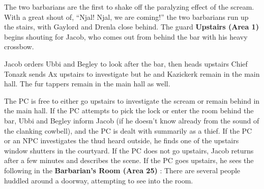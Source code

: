 \documentclass[a5paper,11pt,twoside]{book}
\newcommand{\MapText}[1]{
	{\color{DarkCyan} \textbf{#1}}
}
\newcommand{\QuoteText}[1]{
	{\color{Black!80} {\fontspec{Gotham-Book}\small#1}}
}
\begin{document}
{\QuoteText{The two barbarians are the first to shake off the paralyzing effect of the scream.
With a great shout of, “Njal! Njal, we are coming!” the two barbarians run up the stairs, with Gaylord and Drenla close behind.
The guard \MapText{Upstairs (Area 1)} begins shouting for Jacob, who comes out from behind the bar with his heavy crossbow.}

\QuoteText{Jacob orders Ubbi and Begley to look after the bar, then heads upstairs Chief Tonazk sends Ax upstairs to investigate but he and Kazickerk remain in the main hall.
The fur tappers remain in the main hall as well.}

The PC is free to either go upstairs to investigate the scream or remain behind in the main hall.
If the PC attempts to pick the lock or enter the room behind the bar, Ubbi and Begley inform Jacob (if he doesn’t know already from the sound of the clanking cowbell), and the PC is dealt with summarily as a thief.
If the PC or an NPC investigates the thud heard outside, he finds one of the upstairs window shutters in the courtyard.
If the PC does not go upstairs, Jacob returns after a few minutes and describes the scene.
If the PC goes upstairs, he sees the following in the \MapText{Barbarian’s Room (Area 25)}: There are several people huddled around a doorway, attempting to see into the room.

}
\end{document}

